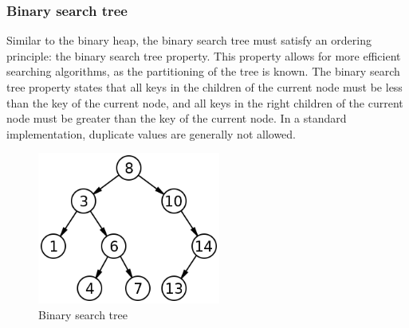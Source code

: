 \documentclass{article}
\begin{document}
\subsubsection{Binary search tree}
Similar to the binary heap, the binary search tree must satisfy an ordering principle: the binary search tree
property. This property allows for more efficient searching algorithms, as the partitioning of the tree is known.
The binary search tree property states that all keys in the children of the current node must be less than the key
of the current node, and all keys in the right children of the current node must be greater than the key of the
current node. In a standard implementation, duplicate values are generally not allowed.

\begin{figure}[H]
    \centering
    \includegraphics[width=6cm]{binary_search_tree}
    \caption{Binary search tree}
  \end{figure}


\end{document}
